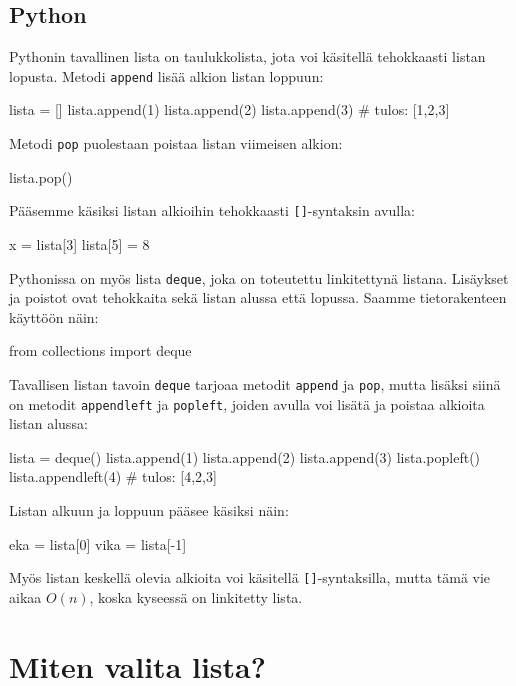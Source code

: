 \subsection{Python}

Pythonin tavallinen lista on taulukkolista,
jota voi käsitellä tehokkaasti listan lopusta.
Metodi \texttt{append} lisää alkion listan loppuun:

\begin{code}
lista = []
lista.append(1)
lista.append(2)
lista.append(3)
# tulos: [1,2,3]
\end{code}

Metodi \texttt{pop} puolestaan poistaa listan viimeisen alkion:

\begin{code}
lista.pop()
\end{code}

Pääsemme käsiksi listan alkioihin tehokkaasti \texttt{[]}-syntaksin avulla:

\begin{code}
x = lista[3]
lista[5] = 8
\end{code}

Pythonissa on myös lista \texttt{deque},
joka on toteutettu linkitettynä listana.
Lisäykset ja poistot ovat tehokkaita sekä listan
alussa että lopussa.
Saamme tietorakenteen käyttöön näin:

\begin{code}
from collections import deque
\end{code}

Tavallisen listan tavoin \texttt{deque} tarjoaa
metodit \texttt{append} ja \texttt{pop},
mutta lisäksi siinä on metodit \texttt{appendleft}
ja \texttt{popleft}, joiden avulla voi lisätä ja poistaa
alkioita listan alussa:

\begin{code}
lista = deque()
lista.append(1)
lista.append(2)
lista.append(3)
lista.popleft()
lista.appendleft(4)
# tulos: [4,2,3]
\end{code}

Listan alkuun ja loppuun pääsee käsiksi näin:

\begin{code}
eka = lista[0]
vika = lista[-1]
\end{code}

Myös listan keskellä olevia alkioita voi käsitellä \texttt{[]}-syntaksilla,
mutta tämä vie aikaa $O(n)$, koska kyseessä on linkitetty lista.

\section{Miten valita lista?}

